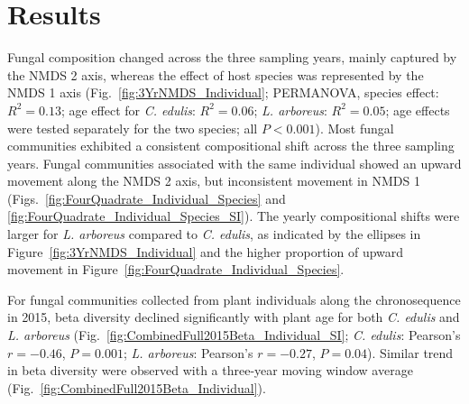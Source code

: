 \section{Results}
Fungal composition changed across the three sampling years, mainly captured by the NMDS 2 axis, whereas the effect of host species was represented by the NMDS 1 axis (Fig.~\ref{fig:3YrNMDS_Individual}; PERMANOVA, species effect: $R^{2}=0.13$; age effect for \textit{C. edulis}: $R^{2}=0.06$; \textit{L. arboreus}: $R^{2}=0.05$; age effects were tested separately for the two species; all $P<0.001$).  
Most fungal communities exhibited a consistent compositional shift across the three sampling years. Fungal communities associated with the same individual showed an upward movement along the NMDS 2 axis, but inconsistent movement in NMDS 1 (Figs.~\ref{fig:FourQuadrate_Individual_Species} and \ref{fig:FourQuadrate_Individual_Species_SI}).
The yearly compositional shifts were larger for \textit{L. arboreus} compared to \textit{C. edulis}, as indicated by the ellipses in Figure~\ref{fig:3YrNMDS_Individual} and the higher proportion of upward movement in Figure~\ref{fig:FourQuadrate_Individual_Species}.
\par


For fungal communities collected from plant individuals along the chronosequence in 2015, beta diversity declined significantly with plant age for both \textit{C. edulis} and \textit{L. arboreus} (Fig.~\ref{fig:CombinedFull2015Beta_Individual_SI}; \textit{C. edulis}: Pearson's $r=-0.46$, $P=0.001$; \textit{L. arboreus}:  Pearson's $r=-0.27$, $P=0.04$). Similar trend in beta diversity were observed with a three-year moving window average (Fig.~\ref{fig:CombinedFull2015Beta_Individual}).
\par


